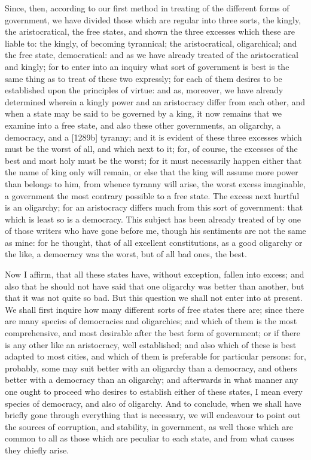 Since, then, according to our first method in treating of the different
forms of government, we have divided those which are regular into three
sorts, the kingly, the aristocratical, the free states, and shown the
three excesses which these are liable to: the kingly, of becoming
tyrannical; the aristocratical, oligarchical; and the free state,
democratical: and as we have already treated of the aristocratical and
kingly; for to enter into an inquiry what sort of government is best is
the same thing as to treat of these two expressly; for each of them
desires to be established upon the principles of virtue: and as, moreover,
we have already determined wherein a kingly power and an aristocracy
differ from each other, and when a state may be said to be governed by a
king, it now remains that we examine into a free state, and also these
other governments, an oligarchy, a democracy, and a [1289b] tyranny; and
it is evident of these three excesses which must be the worst of all, and
which next to it; for, of course, the excesses of the best and most holy
must be the worst; for it must necessarily happen either that the name of
king only will remain, or else that the king will assume more power than
belongs to him, from whence tyranny will arise, the worst excess
imaginable, a government the most contrary possible to a free state. The
excess next hurtful is an oligarchy; for an aristocracy differs much from
this sort of government: that which is least so is a democracy. This
subject has been already treated of by one of those writers who have gone
before me, though his sentiments are not the same as mine: for he thought,
that of all excellent constitutions, as a good oligarchy or the like, a
democracy was the worst, but of all bad ones, the best.

Now I affirm, that all these states have, without exception, fallen into
excess; and also that he should not have said that one oligarchy was
better than another, but that it was not quite so bad. But this question
we shall not enter into at present. We shall first inquire how many
different sorts of free states there are; since there are many species of
democracies and oligarchies; and which of them is the most comprehensive,
and most desirable after the best form of government; or if there is any
other like an aristocracy, well established; and also which of these is
best adapted to most cities, and which of them is preferable for
particular persons: for, probably, some may suit better with an oligarchy
than a democracy, and others better with a democracy than an oligarchy;
and afterwards in what manner any one ought to proceed who desires to
establish either of these states, I mean every species of democracy, and
also of oligarchy. And to conclude, when we shall have briefly gone
through everything that is necessary, we will endeavour to point out the
sources of corruption, and stability, in government, as well those which
are common to all as those which are peculiar to each state, and from what
causes they chiefly arise.

